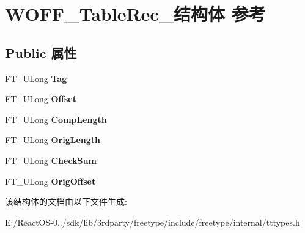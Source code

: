\hypertarget{struct_w_o_f_f___table_rec__}{}\section{W\+O\+F\+F\+\_\+\+Table\+Rec\+\_\+结构体 参考}
\label{struct_w_o_f_f___table_rec__}
\subsection*{Public 属性}
\begin{DoxyCompactItemize}
\item 
\mbox{\label{struct_w_o_f_f___table_rec___a180f01c612c0f50795b78764bc6d85a1}} 
F\+T\+\_\+\+U\+Long {\bfseries Tag}
\item 
\mbox{\label{struct_w_o_f_f___table_rec___aac56c27dce54415c889ad2be4045851c}} 
F\+T\+\_\+\+U\+Long {\bfseries Offset}
\item 
\mbox{\label{struct_w_o_f_f___table_rec___a273aa7c18d810be6808e2c857320f7c5}} 
F\+T\+\_\+\+U\+Long {\bfseries Comp\+Length}
\item 
\mbox{\label{struct_w_o_f_f___table_rec___a42dd043bbef5656aa32461fc0def8340}} 
F\+T\+\_\+\+U\+Long {\bfseries Orig\+Length}
\item 
\mbox{\label{struct_w_o_f_f___table_rec___a7731a05b663d6bc3548d7c2a9a59f432}} 
F\+T\+\_\+\+U\+Long {\bfseries Check\+Sum}
\item 
\mbox{\label{struct_w_o_f_f___table_rec___a1722f43cd00f44068a777808525624f1}} 
F\+T\+\_\+\+U\+Long {\bfseries Orig\+Offset}
\end{DoxyCompactItemize}


该结构体的文档由以下文件生成\+:\begin{DoxyCompactItemize}
\item 
E\+:/\+React\+O\+S-\/0../sdk/lib/3rdparty/freetype/include/freetype/internal/tttypes.\+h\end{DoxyCompactItemize}
